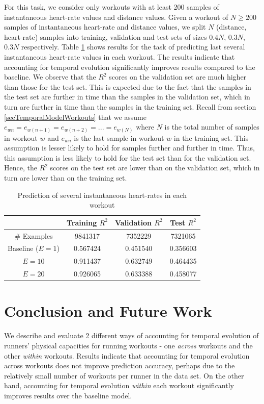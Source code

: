 \documentclass{acm_proc_article-sp}
\begin{document}
For this task, we consider only workouts with at least 200 samples of instantaneous heart-rate values and distance values. Given a workout of $N \geq 200$ samples of instantaneous heart-rate and distance values, we split $N$ (distance, heart-rate) samples into training, validation and test sets of sizes $0.4N$, $0.3N$, $0.3N$ respectively. Table \ref{tableInstManyHr} shows results for the task of predicting last several instantaneous heart-rate values in each workout. The results indicate that accounting for temporal evolution significantly improves results compared to the baseline. We observe that the $R^2$ scores on the validation set are much higher than those for the test set. This is expected due to the fact that the samples in the test set are further in time than the samples in the validation set, which in turn are further in time than the samples in the training set. Recall from section \ref{secTemporalModelWorkouts} that we assume $e_{wn} = e_{w(n+1)} = e_{w(n+2)} = ... = e_{w(N)}$ where $N$ is the total number of samples in workout $w$ and $e_{wn}$ is the last sample in workout $w$ in the training set. This assumption is lesser likely to hold for samples further and further in time. Thus, this assumption is less likely to hold for the test set than for the validation set. Hence, the $R^2$ scores on the test set are lower than on the validation set, which in turn are lower than on the training set.
\begin{table}[H]
\centering
\begin{tabular}{|c|c|c|c|} \hline
& Training $R^2$ & Validation $R^2$ & Test $R^2$ \\ \hline
\# Examples &  9841317 & 7352229 & 7321065 \\ \hline
Baseline ($E = 1$) & 0.567424 & 0.451540 & 0.356603 \\ \hline
$E = 10$ & 0.911437 & 0.632749 & 0.464435 \\ \hline
$E = 20$ &  0.926065 & 0.633388 & 0.458077 \\ \hline
\end{tabular}
\caption{Prediction of several instantaneous heart-rates in each workout}
\label{tableInstManyHr}
\end{table}

\section{Conclusion and Future Work}
We describe and evaluate 2 different ways of accounting for temporal evolution of runners' physical capacities for running workouts - one \emph{across} workouts and the other \emph{within} workouts. Results indicate that accounting for temporal evolution across workouts does not improve prediction accuracy, perhaps due to the relatively small number of workouts per runner in the data set. On the other hand, accounting for temporal evolution \emph{within} each workout significantly improves results over the baseline model.
\end{document}
